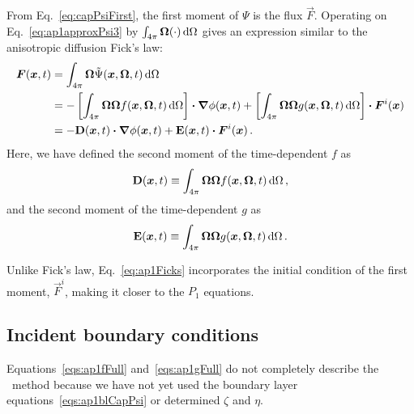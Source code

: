 From Eq.~\eqref{eq:capPsiFirst}, the first moment of $\Psi$ is the flux
$\vec{F}$. Operating on Eq.~\eqref{eq:ap1approxPsi3} by $\int_{4\pi}
\bm{\Omega} (\cdot) \mathop{}\!\mathrm{d}\Omega$ gives an expression similar to the anisotropic
diffusion Fick's law:
\begin{align} \nonumber
  \bm{F}(\bm{x}, t)
  &= \int_{4\pi} \bm{\Omega} \tilde \Psi(\bm{x}, \bm{\Omega}, t) \mathop{}\!\mathrm{d}\Omega
  \\ \nonumber
  &= 
  - \left[ \int_{4\pi} \bm{\Omega} \bm{\Omega} f(\bm{x}, \bm{\Omega}, t)
  \mathop{}\!\mathrm{d}\Omega \right]
  \bm{\cdot} \bm{\nabla} \phi(\bm{x},t)
  + \left[ \int_{4\pi} \bm{\Omega} \bm{\Omega} g(\bm{x}, \bm{\Omega}, t)
  \mathop{}\!\mathrm{d}\Omega \right]
  \bm{\cdot} \bm{F}^i(\bm{x})
  \\ \label{eq:ap1Ficks}
  &= - \mathbf{D}(\bm{x},t) \bm{\cdot} \bm{\nabla} \phi(\bm{x},t)
  + \mathbf{E}(\bm{x},t) \bm{\cdot} \bm{F}^i(\bm{x})\,.
\end{align}
Here, we have defined the second moment of the time-dependent $f$ as
\begin{equation}\label{eq:ap1dDefinition}
  \mathbf{D}(\bm{x},t) \equiv \int_{4\pi} \bm{\Omega} \bm{\Omega}
  f(\bm{x}, \bm{\Omega},t) \mathop{}\!\mathrm{d}\Omega \,,
\end{equation}
and the second moment of the time-dependent $g$ as
\begin{equation}\label{eq:ap1eDefinition}
  \mathbf{E}(\bm{x},t) \equiv \int_{4\pi} \bm{\Omega} \bm{\Omega}
  g(\bm{x}, \bm{\Omega}, t) \mathop{}\!\mathrm{d}\Omega \,.
\end{equation}

Unlike Fick's law, Eq.~\eqref{eq:ap1Ficks} incorporates the initial condition of
the first moment, $\vec{F}^i$, making it closer to the $P_1$ equations.

\subsection{Incident boundary conditions}
Equations~\eqref{eqs:ap1fFull} and~\eqref{eqs:ap1gFull} do not completely
describe the \APone\ method because we have not yet used the boundary layer
equations~\eqref{eqs:ap1blCapPsi} or determined $\zeta$ and $\eta$.

